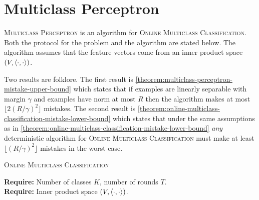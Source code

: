 \section{Multiclass Perceptron}
\label{section:multiclass-perceptron-proofs}

\textsc{Multiclass Perceptron} is an algorithm for \textsc{Online Multiclass
Classification}. Both the protocol for the problem and the algorithm are stated
below. The algorithm assumes that the feature vectors come from an inner product
space $(V, \left\langle \cdot, \cdot \right\rangle)$.

Two results are folklore. The first result is
\autoref{theorem:multiclass-perceptron-mistake-upper-bound} which states that if
examples are linearly separable with margin $\gamma$ and examples have norm
at most $R$ then the algorithm makes at most $\lfloor 2 (R/\gamma)^2 \rfloor$
mistakes. The second result is
\autoref{theorem:online-multiclass-classification-mistake-lower-bound} which
states that under the same assumptions as in
\autoref{theorem:online-multiclass-classification-mistake-lower-bound}
\emph{any} deterministic algorithm for \textsc{Online Multiclass Classification}
must make at least $\lfloor (R/\gamma)^2 \rfloor$ mistakes in the worst case.

\begin{protocol}[h]
\caption{\textsc{Online Multiclass Classification}
\label{algorithm:mutliclass-classification}}
\textbf{Require:} Number of classes $K$, number of rounds $T$. \\
\textbf{Require:} Inner product space $(V,\left\langle \cdot, \cdot \right\rangle)$. \\
\end{protocol}

